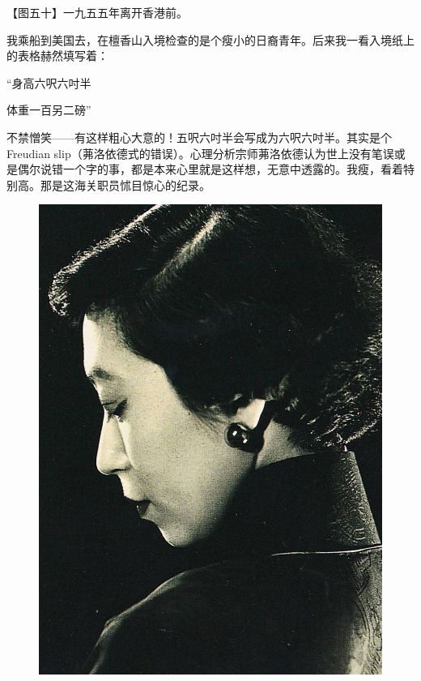 \clearpage
\par 【图五十】一九五五年离开香港前。
\par 我乘船到美国去，在檀香山入境检查的是个瘦小的日裔青年。后来我一看入境纸上的表格赫然填写着：
\par “身高六呎六吋半
\par 体重一百另二磅”
\par 不禁憎笑——有这样粗心大意的！五呎六吋半会写成为六呎六吋半。其实是个Freudian slip（茀洛依德式的错误）。心理分析宗师茀洛依德认为世上没有笔误或是偶尔说错一个字的事，都是本来心里就是这样想，无意中透露的。我瘦，看着特别高。那是这海关职员怵目惊心的纪录。
\begin{figure}[htb]
    \centering %
    \includegraphics[scale=0.4]{picture/对照记50.jpeg}
\end{figure}



